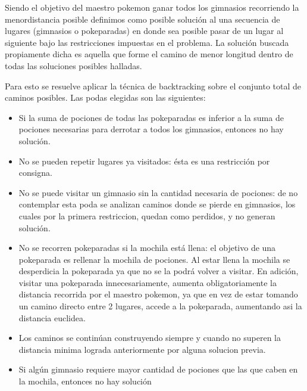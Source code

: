 Siendo el objetivo del maestro pokemon ganar todos los gimnasios recorriendo la menordistancia posible definimos como posible solución al una secuencia de lugares (gimnasios o pokeparadas) en donde sea posible pasar de un lugar al siguiente bajo las restricciones impuestas en el problema. La solución buscada propiamente dicha es aquella que forme el camino de menor longitud dentro de todas las soluciones posibles halladas.

Para esto se resuelve aplicar la técnica de backtracking sobre el conjunto total de caminos posibles. Las podas elegidas son las siguientes:

\begin{itemize}
\item Si la suma de pociones de todas las pokeparadas es inferior a la suma de pociones necesarias para derrotar a todos los gimnasios, entonces no hay solución.
\item No se pueden repetir lugares ya visitados: ésta es una restricción por consigna.
\item No se puede visitar un gimnasio sin la cantidad necesaria de pociones: de no contemplar esta poda se analizan caminos donde se pierde en gimnasios, los cuales por la primera restriccion, quedan como perdidos, y no generan solución.
\item No se recorren pokeparadas si la mochila está llena: el objetivo de una pokeparada es rellenar la mochila de pociones. Al estar llena la mochila se desperdicia la pokeparada ya que no se la podrá volver a visitar. En adición, visitar una pokeparada innecesariamente, aumenta obligatoriamente la distancia recorrida por el maestro pokemon, ya que en vez de estar tomando un camino directo entre 2 lugares, accede a la pokeparada, aumentando asi la distancia euclidea.
\item Los caminos se continúan construyendo siempre y cuando no superen la distancia minima lograda anteriormente por alguna solucion previa.
\item Si algún gimnasio requiere mayor cantidad de pociones que las que caben en la mochila, entonces no hay solución 

\end{itemize}